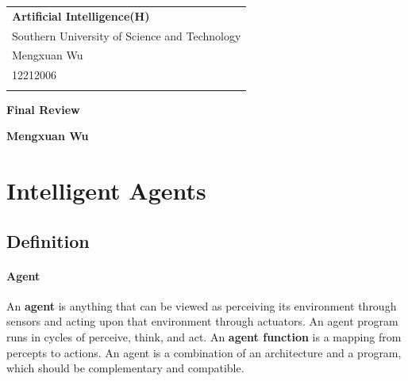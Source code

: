 \documentclass[a4paper,12pt]{article}
\begin{document}



\thispagestyle{empty} %

\begin{tabular}{p{15.5cm}}
{\large \bf Artificial Intelligence(H)} \\
Southern University of Science and Technology \\ Mengxuan Wu \\ 12212006 \\
\hline
\\
\end{tabular}

\vspace*{0.3cm} %

\begin{center}
	{\Large \bf Final Review}
	\vspace{2mm}

	{\bf Mengxuan Wu}
		
\end{center}  

\vspace{0.4cm}

\section{Intelligent Agents}

\subsection{Definition}

\paragraph{Agent} An \textbf{agent} is anything that can be viewed as perceiving its environment through sensors and acting upon that environment through actuators. An agent program runs in cycles of perceive, think, and act. An \textbf{agent function} is a mapping from percepts to actions. An agent is a combination of an architecture and a program, which should be complementary and compatible.
\end{document}
